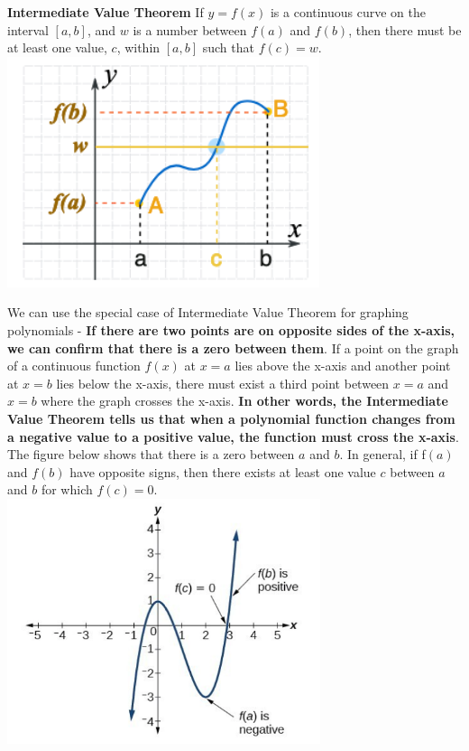 \documentclass{book}
\begin{document}
	\begin{mdframed}[backgroundcolor=yellow]
		\textbf{Intermediate Value Theorem} If $y = f(x)$ is a continuous curve on the interval $[a,b]$, and $w$ is a number between $f(a)$ and $f(b)$, then there must be at least one value, $c$, within $[a,b]$ such that $f(c)=w$. \\
		
		\includegraphics[scale=0.6]{ivt}
	\end{mdframed} 
	
	We can use the special case of Intermediate Value Theorem for graphing polynomials - \textbf{If there are two points are on opposite sides of the x-axis, we can confirm that there is a zero between them}. If a point on the graph of a continuous function $f(x)$ at $x=a$ lies above the x-axis and another point at $x=b$ lies below the x-axis, there must exist a third point between $x=a$ and $x=b$ where the graph crosses the x-axis. \textbf{In other words, the Intermediate Value Theorem tells us that when a polynomial function changes from a negative value to a positive value, the function must cross the x-axis}. The figure below shows that there is a zero between $a$ and $b$. In general, if f$(a)$ and $f(b)$ have opposite signs, then there exists at least one value $c$ between $a$ and $b$ for which $f(c)=0$. \\
	
	\includegraphics[scale=0.6]{ivt1}
	
\end{document}
